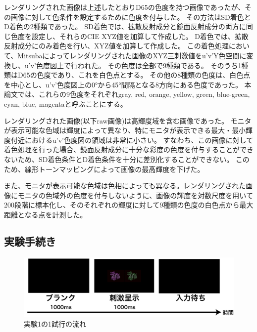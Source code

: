             レンダリングされた画像は上述したとおりD65の色度を持つ画像であったが、その画像に対して色条件を設定するために色度を付与した。
            その方法はSD着色とD着色の2種類であった。
            SD着色では、拡散反射成分と鏡面反射成分の両方に同じ色度を設定し、それらのCIE XYZ値を加算して作成した。
            D着色では、拡散反射成分にのみ着色を行い、XYZ値を加算して作成した。
            この着色処理において、Mitsubaによってレンダリングされた画像のXYZ三刺激値をu’v’Y色空間に変換し、u’v’色度図上で行われた。
            その色度は全部で9種類である。
            そのうち1種類はD65の色度であり、これを白色点とする。
            その他の8種類の色度は、白色点を中心とし、u’v’色度図上の0°から45°間隔となる8方向にある色度であった。
            本論文では、これらの9色度をそれぞれgray, red, orange, yellow, green, blue-green, cyan, blue, magentaと呼ぶことにする。

            レンダリングされた画像(以下raw画像)は高輝度域を含む画像であった。
            モニタが表示可能な色域は輝度によって異なり、特にモニタが表示できる最大・最小輝度付近におけるu'v'色度図の領域は非常に小さい。
            すなわち、この画像に対して着色処理を行った場合、鏡面反射成分に十分な彩度の色度を付与することができないため、SD着色条件とD着色条件を十分に差別化することができない。
            このため、線形トーンマッピングによって画像の最高輝度を下げた。

            また、モニタが表示可能な色域は色相によっても異なる。レンダリングされた画像にモニタの色域外の色度を付与しないように、画像の輝度を対数尺度を用いて200段階に標本化し、そのそれぞれの輝度に対して9種類の色度の白色点から最大距離となる点を計測した。


    \subsection{実験手続き}

        \begin{figure}
            \centering
            \includegraphics[width=14.0cm]{./img/ex1_procedure.png}
            \caption{実験1の1試行の流れ}
            \label{ex1_procedure}
        \end{figure}

